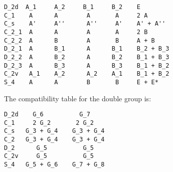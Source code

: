 \documentclass[12pt,a4paper,twoside]{report}
\begin{document}
\begin{tcolorbox}
\begin{footnotesize}
\begin{verbatim}
D_2d  A_1     A_2     B_1     B_2    E
C_1    A      A        A       A     2 A 
C_s    A'     A''      A''     A'    A' + A''  
C_2_1  A      A        A       A     2 B
C_2_2  A      B        A       B     A + B
D_2_1  A      B_1      A      B_1    B_2 + B_3
D_2_2  A      B_2      A      B_2    B_1 + B_3
D_2_3  A      B_3      A      B_3    B_1 + B_2
C_2v   A_1    A_2      A_2    A_1    B_1 + B_2
S_4    A      A        B       B     E + E*
\end{verbatim}
\end{footnotesize}
\end{tcolorbox}

The compatibility table for the double group is:

\begin{tcolorbox}
\begin{footnotesize}
\begin{verbatim}
D_2d    G_6          G_7  
C_1     2 G_2       2 G_2 
C_s   G_3 + G_4    G_3 + G_4
C_2   G_3 + G_4    G_3 + G_4
D_2      G_5          G_5
C_2v     G_5          G_5
S_4   G_5 + G_6    G_7 + G_8
\end{verbatim}
\end{footnotesize}
\end{tcolorbox}
\end{document}
